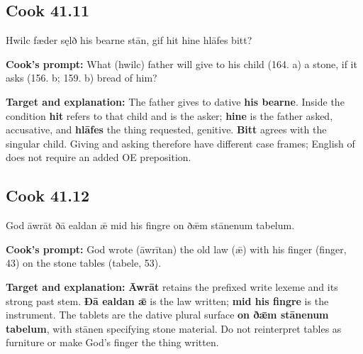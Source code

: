 \par\begin{minipage}{\linewidth}\raggedright
\subsection*{Cook 41.11}

Hwilc fæder sęlð his bearne stān, gif hit hine hlāfes bitt?

\textbf{Cook's prompt:} What (hwilc) father will give to his child (164. a) a stone, if it asks (156. b; 159. b) bread of him?

\textbf{Target and explanation:} The father gives to dative \textbf{his bearne}. Inside the condition \textbf{hit} refers to that child and is the asker; \textbf{hine} is the father asked, accusative, and \textbf{hlāfes} the thing requested, genitive. \textbf{Bitt} agrees with the singular child. Giving and asking therefore have different case frames; English of does not require an added OE preposition.

\end{minipage}\par\addvspace{4pt}

\par\begin{minipage}{\linewidth}\raggedright
\subsection*{Cook 41.12}

God āwrāt ðā ealdan ǣ mid his fingre on ðǣm stānenum tabelum.

\textbf{Cook's prompt:} God wrote (āwrītan) the old law (ǣ) with his finger (finger, 43) on the stone tables (tabele, 53).

\textbf{Target and explanation:} \textbf{Āwrāt} retains the prefixed write lexeme and its strong past stem. \textbf{Ðā ealdan ǣ} is the law written; \textbf{mid his fingre} is the instrument. The tablets are the dative plural surface \textbf{on ðǣm stānenum tabelum}, with stānen specifying stone material. Do not reinterpret tables as furniture or make God's finger the thing written.

\end{minipage}\par\addvspace{4pt}


